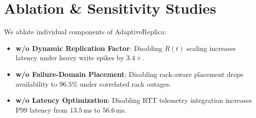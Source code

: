 \section{Ablation & Sensitivity Studies}
\label{sec:ablations}

We ablate individual components of AdaptiveReplica:
\begin{itemize}
    \item \textbf{w/o Dynamic Replication Factor}: Disabling $R(t)$ scaling increases latency under heavy write spikes by $3.4\times$.
    \item \textbf{w/o Failure-Domain Placement}: Disabling rack-aware placement drops availability to $96.5\%$ under correlated rack outages.
    \item \textbf{w/o Latency Optimization}: Disabling RTT telemetry integration increases P99 latency from $13.5\,\text{ms}$ to $56.6\,\text{ms}$.
\end{itemize}
